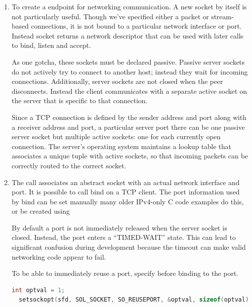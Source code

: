 \begin{enumerate}

  \item {}

  To create a endpoint for networking communication.
  A new socket by itself is not particularly useful.
  Though we've specified either a packet or stream-based connections, it is not bound to a particular network interface or port.
  Instead socket returns a network descriptor that can be used with later calls to bind, listen and accept.

  As one gotcha, these sockets must be declared passive. Passive server sockets do not actively try to connect to another host; instead they wait for incoming connections.
  Additionally, server sockets are not closed when the peer disconnects.
  Instead the client communicates with a separate active socket on the server that is specific to that connection.

  Since a TCP connection is defined by the sender address and port along with a receiver address and port, a particular server port there can be one passive server socket but multiple active sockets: one for each currently open connection.
  The server's operating system maintains a lookup table that associates a unique tuple with active sockets, so that incoming packets can be correctly routed to the correct socket.

  \item {}

  The  call associates an abstract socket with an actual network interface and port.
  It is possible to call bind on a TCP client.
  The port information used by bind can be set manually many older IPv4-only C code examples do this, or be created using 

  By default a port is not immediately released when the server socket is closed.
  Instead, the port enters a ``TIMED-WAIT'' state.
  This can lead to significant confusion during development because the timeout can make valid networking code appear to fail.

  To be able to immediately reuse a port, specify  before binding to the port.

  \begin{lstlisting}[language=C]
  int optval = 1;
  setsockopt(sfd, SOL_SOCKET, SO_REUSEPORT, &optval, sizeof(optval));


\end{lstlisting}
\end{enumerate}
